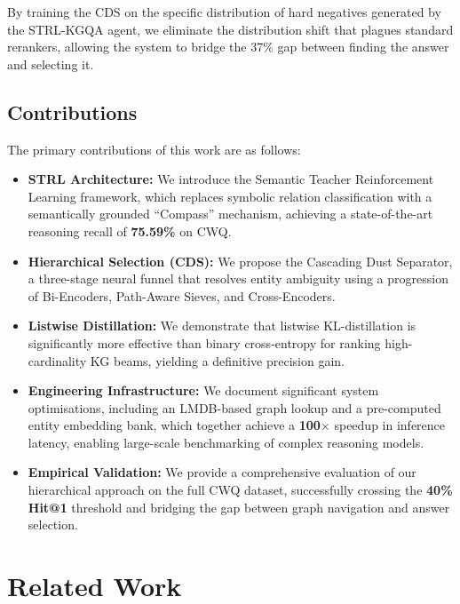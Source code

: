 \documentclass[11pt,a4paper]{article}
\newcommand{\STRL}{\textsc{STRL-KGQA}}
\newcommand{\CDS}{\textsc{CDS}}
\begin{document}
By training the \CDS{} on the specific distribution of hard negatives
generated by the \STRL{} agent, we eliminate the distribution shift that
plagues standard rerankers, allowing the system to bridge the 37\% gap
between finding the answer and selecting it.

\subsection{Contributions}
The primary contributions of this work are as follows:
\begin{itemize}
    \item \textbf{STRL Architecture:} We introduce the Semantic Teacher
          Reinforcement Learning framework, which replaces symbolic relation
          classification with a semantically grounded ``Compass'' mechanism,
          achieving a state-of-the-art reasoning recall of \textbf{75.59\%} on CWQ.
    \item \textbf{Hierarchical Selection (CDS):} We propose the Cascading Dust
          Separator, a three-stage neural funnel that resolves entity ambiguity
          using a progression of Bi-Encoders, Path-Aware Sieves, and
          Cross-Encoders.
    \item \textbf{Listwise Distillation:} We demonstrate that listwise
          KL-distillation is significantly more effective than binary cross-entropy
          for ranking high-cardinality KG beams, yielding a definitive precision
          gain.
    \item \textbf{Engineering Infrastructure:} We document significant system
          optimisations, including an LMDB-based graph lookup and a pre-computed
          entity embedding bank, which together achieve a \textbf{100$\times$}
          speedup in inference latency, enabling large-scale benchmarking of
          complex reasoning models.
    \item \textbf{Empirical Validation:} We provide a comprehensive evaluation
          of our hierarchical approach on the full CWQ dataset, successfully
          crossing the \textbf{40\% Hit@1} threshold and bridging the gap between
          graph navigation and answer selection.
\end{itemize}


\section{Related Work}
\label{sec:related}
\end{document}
